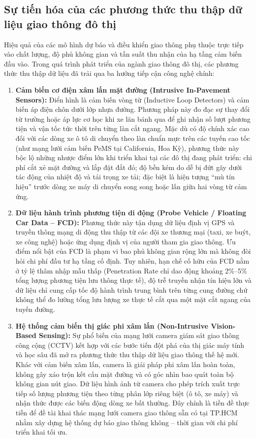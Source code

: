 \subsection{Sự tiến hóa của các phương thức thu thập dữ liệu giao thông đô thị}
Hiệu quả của các mô hình dự báo và điều khiển giao thông phụ thuộc trực tiếp vào chất lượng, độ phủ không gian và tần suất thu nhận của hạ tầng cảm biến đầu vào. Trong quá trình phát triển của ngành giao thông đô thị, các phương thức thu thập dữ liệu đã trải qua ba hướng tiếp cận công nghệ chính:
\begin{enumerate}
    \item \textbf{Cảm biến cơ điện xâm lấn mặt đường (Intrusive In-Pavement Sensors):}
    Điển hình là cảm biến vòng từ (Inductive Loop Detectors) và cảm biến áp điện chôn dưới lớp nhựa đường. Phương pháp này đo đạc sự thay đổi từ trường hoặc áp lực cơ học khi xe lăn bánh qua để ghi nhận số lượt phương tiện và vận tốc tức thời trên từng làn cắt ngang. Mặc dù có độ chính xác cao đối với các dòng xe ô tô di chuyển theo làn chuẩn mực trên các tuyến cao tốc (như mạng lưới cảm biến PeMS tại California, Hoa Kỳ), phương thức này bộc lộ những nhược điểm lớn khi triển khai tại các đô thị đang phát triển: chi phí cắt xẻ mặt đường và lắp đặt đắt đỏ; độ bền kém do dễ bị đứt gãy dưới tác động của nhiệt độ và tải trọng xe tải; đặc biệt là hiện tượng ``mù tín hiệu'' trước dòng xe máy di chuyển song song hoặc lấn giữa hai vòng từ cảm ứng.
    
    \item \textbf{Dữ liệu hành trình phương tiện di động (Probe Vehicle / Floating Car Data -- FCD):}
    Phương thức này tận dụng dữ liệu định vị GPS và truyền thông mạng di động thu thập từ các đội xe thương mại (taxi, xe buýt, xe công nghệ) hoặc ứng dụng định vị của người tham gia giao thông. Ưu điểm nổi bật của FCD là phạm vi bao phủ không gian rộng lớn mà không đòi hỏi chi phí đầu tư hạ tầng cố định. Tuy nhiên, hạn chế cố hữu của FCD nằm ở tỷ lệ thâm nhập mẫu thấp (Penetration Rate chỉ dao động khoảng 2\%--5\% tổng lượng phương tiện lưu thông thực tế), độ trễ truyền nhận tín hiệu lớn và dữ liệu chỉ cung cấp tốc độ hành trình trung bình trên từng cung đường chứ không thể đo lường tổng lưu lượng xe thực tế cắt qua một mặt cắt ngang của tuyến đường.
    
    \item \textbf{Hệ thống cảm biến thị giác phi xâm lấn (Non-Intrusive Vision-Based Sensing):}
    Sự phổ biến của mạng lưới camera giám sát giao thông công cộng (CCTV) kết hợp với các bước tiến đột phá của thị giác máy tính và học sâu đã mở ra phương thức thu thập dữ liệu giao thông thế hệ mới. Khác với cảm biến xâm lấn, camera là giải pháp phi xâm lấn hoàn toàn, không gây xáo trộn kết cấu mặt đường và có góc nhìn bao quát toàn bộ không gian nút giao. Dữ liệu hình ảnh từ camera cho phép trích xuất trực tiếp số lượng phương tiện theo từng phân lớp riêng biệt (ô tô, xe máy) và nhận thức được các biến động dòng xe bất thường. Đây chính là tiền đề thực tiễn để đề tài khai thác mạng lưới camera giao thông sẵn có tại TP.HCM nhằm xây dựng hệ thống dự báo giao thông không -- thời gian với chi phí triển khai tối ưu.
\end{enumerate}

